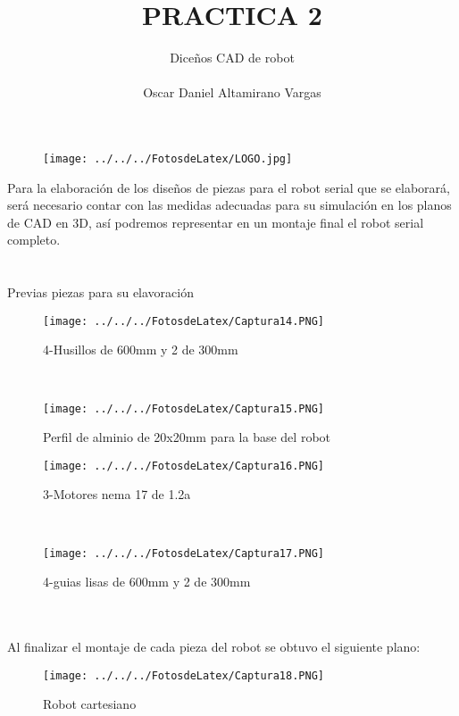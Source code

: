 \documentclass[12pt]{article}
\title{PRACTICA 2}
\author{Diceños CAD de robot \\ \\ Oscar Daniel Altamirano Vargas\\}
\begin{document}
 
\maketitle
\begin{figure}[hbtp]
\centering
\texttt{[image: ../../../FotosdeLatex/LOGO.jpg]}
\end{figure}
\pagebreak

Para la elaboración de los diseños de piezas para el robot serial que se elaborará, será necesario contar con las medidas adecuadas para su simulación en los planos de CAD en 3D, así podremos representar en un montaje final el robot serial completo.\\
\\ \\
Previas piezas para su elavoración 
\begin{figure}[hbtp]
\caption{4-Husillos de 600mm y 2 de 300mm }
\centering
\texttt{[image: ../../../FotosdeLatex/Captura14.PNG]}
\end{figure} \\
\begin{figure}[hbtp]
\caption{Perfil de alminio de 20x20mm para la base del robot}
\centering
\texttt{[image: ../../../FotosdeLatex/Captura15.PNG]}
\end{figure}
\pagebreak
\begin{figure}[hbtp]
\caption{       3-Motores nema 17 de 1.2a}
\centering
\texttt{[image: ../../../FotosdeLatex/Captura16.PNG]}
\end{figure} \\
\begin{figure}[hbtp]
\caption{     4-guias lisas de 600mm y 2 de 300mm}
\centering
\texttt{[image: ../../../FotosdeLatex/Captura17.PNG]}
\end{figure}\\\\

\pagebreak
Al finalizar el montaje de cada pieza del robot se obtuvo el siguiente plano:\\
\begin{figure}[hbtp]
 \caption{Robot cartesiano}
 \centering
 \texttt{[image: ../../../FotosdeLatex/Captura18.PNG]}
 \end{figure}
  
\pagebreak
\end{document}
